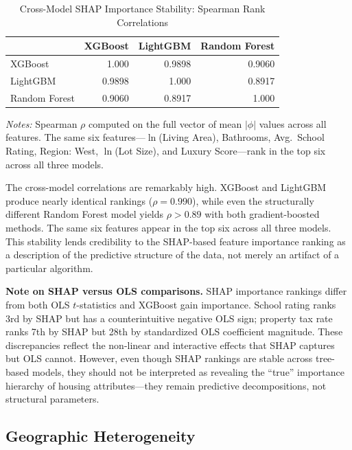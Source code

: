 \begin{table}[H]
\centering
\caption{Cross-Model SHAP Importance Stability: Spearman Rank Correlations}
\label{tab:shap_stability}
\begin{threeparttable}
\begin{tabular}{lrrr}
\toprule
& XGBoost & LightGBM & Random Forest \\
\midrule
XGBoost & 1.000 & 0.9898 & 0.9060 \\
LightGBM & 0.9898 & 1.000 & 0.8917 \\
Random Forest & 0.9060 & 0.8917 & 1.000 \\
\bottomrule
\end{tabular}
\begin{tablenotes}
\small
\item \textit{Notes:} Spearman $\rho$ computed on the full vector of mean $|\phi|$ values across all features. The same six features---$\ln$(Living Area), Bathrooms, Avg.\ School Rating, Region: West, $\ln$(Lot Size), and Luxury Score---rank in the top six across all three models.
\end{tablenotes}
\end{threeparttable}
\end{table}

The cross-model correlations are remarkably high. XGBoost and LightGBM produce nearly identical rankings ($\rho = 0.990$), while even the structurally different Random Forest model yields $\rho > 0.89$ with both gradient-boosted methods. The same six features appear in the top six across all three models. This stability lends credibility to the SHAP-based feature importance ranking as a description of the predictive structure of the data, not merely an artifact of a particular algorithm.

\textbf{Note on SHAP versus OLS comparisons.} SHAP importance rankings differ from both OLS $t$-statistics and XGBoost gain importance. School rating ranks 3rd by SHAP but has a counterintuitive negative OLS sign; property tax rate ranks 7th by SHAP but 28th by standardized OLS coefficient magnitude. These discrepancies reflect the non-linear and interactive effects that SHAP captures but OLS cannot. However, even though SHAP rankings are stable across tree-based models, they should not be interpreted as revealing the ``true'' importance hierarchy of housing attributes---they remain predictive decompositions, not structural parameters.


\subsection{Geographic Heterogeneity}

